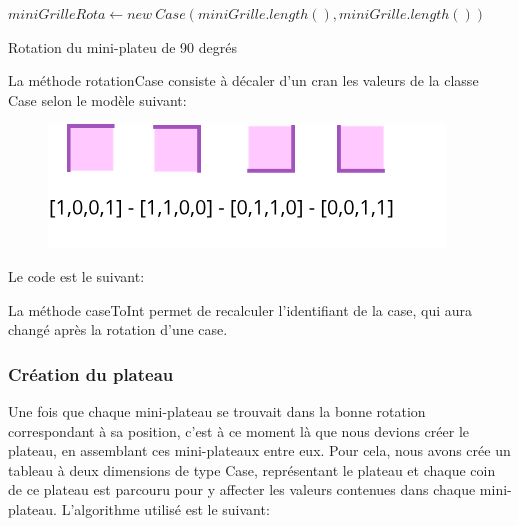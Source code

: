 \documentclass[a4paper, 12pt]{article}
\begin{document}
            \begin{algorithm}[H]%
                \DontPrintSemicolon
                $miniGrilleRota \gets new \ Case(miniGrille.length(), miniGrille.length())$
                
                \;
                \caption{\sc Rotation du mini-plateu de 90 degrés}
            \end{algorithm}%
            
            \vspace{0.8cm}
            La méthode rotationCase consiste à décaler d'un cran les valeurs de la classe Case selon le modèle suivant:
            
           \begin{figure}[H]
               \centering
               \includegraphics[scale=0.7]{images/rotaCase.png}
           \end{figure}
           
           Le code est le suivant:
           
            
            
        La méthode caseToInt permet de recalculer l'identifiant de la case, qui aura changé après la rotation d'une case.
            
                
        \subsubsection{Création du plateau}
            Une fois que chaque mini-plateau se trouvait dans la bonne rotation correspondant à sa position, c'est à ce moment là que nous devions créer le plateau, en assemblant ces mini-plateaux entre eux. Pour cela, nous avons crée un tableau à deux dimensions de type Case, représentant le plateau et chaque coin de ce plateau est parcouru pour y affecter les valeurs contenues dans chaque mini-plateau. L'algorithme utilisé est le suivant:
            
\end{document}

